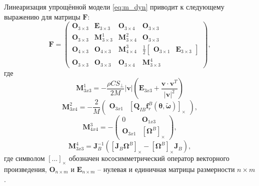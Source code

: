 Линеаризация упрощённой модели \eqref{eq:m_dyn} приводит к следующему выражению для матрицы $\bm F$:
\begin{equation}
{\bm{F}} =
\left( {\begin{array}{*{20}{c}}
	{{{\bm{O}}_{3\times3}}}&{{{\bm{E}}_{3\times3}}}&{{{\bm{O}}_{3\times4}}}&{{{\bm{O}}_{3\times3}}}\\
	{{{\bm{O}}_{3\times3}}}&{{\bm{M}}_{3\times3}^1}&{{\bm{M}}_{3\times4}^2}&{{{\bm{O}}_{3\times3}}}\\
	{{{\bm{O}}_{4\times3}}}&{{{\bm{O}}_{4\times3}}}&{{\bm{M}}_{4\times4}^3}&{\frac{1}{2}\left[ {\begin{array}{*{20}{c}}
			{{{\bm{O}}_{3\times1}}}&{{{\bm{E}}_{3\times3}}}
			\end{array}} \right]}\\
	{{{\bm{O}}_{3\times3}}}&{{{\bm{O}}_{3\times3}}}&{{{\bm{O}}_{3\times4}}}&{{\bm{M}}_{3\times3}^4}
	\end{array}} \right),
\end{equation}
где
\begin{equation}
{{\bm{M}}_{3x3}^1 =  - \frac{{\rho C{S_ \bot }}}{{2M}}\left| {\bm{v}} \right|\left( {{{\bm{E}}_{3x3}} + \frac{{{\bm{v}} \cdot {{\bm{v}}^T}}}{{{{\left| {\bm{v}} \right|}^2}}}} \right)}
\end{equation}
\vspace{3mm}
\begin{equation}
{{\bm{M}}_{3x4}^2 =  - \frac{2}{M}\left( {\begin{array}{*{20}{c}}
		{{{\bm{O}}_{3x1}}}&{{{\left[ {{{\bm{Q}}_{IB}}{\bm{f}}_{\ddot r}^B({\bm{\theta }},{\bm{\tilde \omega }})} \right]}_ \times }}
		\end{array}} \right)},
\end{equation}
\vspace{3mm}
\begin{equation}
{\bm{M}}_{4x4}^3 =  - \left( {\begin{array}{*{20}{c}}
	0&{{{\bm{O}}_{1x3}}}\\
	{{{\bm{O}}_{3x1}}}&{{{[{{\bm{\Omega }}^B}]}_ \times }}
	\end{array}} \right),
\end{equation}
\vspace{3mm}
\begin{equation}
{{\bm{M}}_{3x3}^4 = {\bm{J}}_B^{ - 1}\left( {{{\left[ {{{\bm{J}}_B}{{\bm{\Omega }}^B}} \right]}_ \times } - {{\left[ {{{\bm{\Omega }}^B}} \right]}_ \times }{{\bm{J}}_B}} \right)},
\end{equation}
где символом ${\left[ {...} \right]_ \times }$  обозначен кососимметрический оператор векторного произведения,
${{{\bm{O}}_{n\times m}}}$ и ${{{\bm{E}}_{n\times m}}}$ -- нулевая и единичная матрицы размерности $n \times m$.

